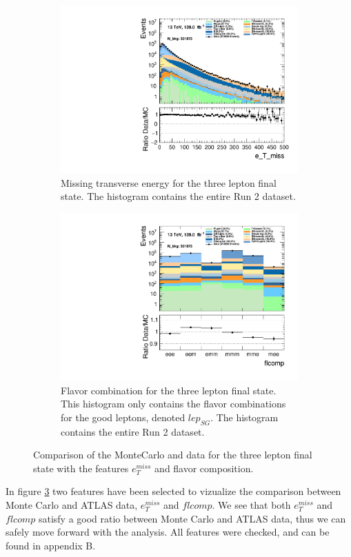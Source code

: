 \begin{figure}
    \centering
    \begin{subfigure}{.6\textwidth}
        \includegraphics[width=\textwidth]{Figures/MC_Data_comp/e_T_miss.pdf}
        \caption{Missing transverse energy for the three lepton final state. The histogram contains the entire Run 2 dataset.}
        \label{fig:etmiss}
    \end{subfigure}
    \hfill
    \begin{subfigure}{.6\textwidth}
        \includegraphics[width=\textwidth]{Figures/MC_Data_comp/flcomp.pdf}
        \caption{Flavor combination for the three lepton final state. This histogram only contains the flavor combinations for the good leptons, denoted $lep_{SG}$. The histogram contains the entire Run 2 dataset. }
        \label{fig:flcomp}
    \end{subfigure}
    \hfill        
    \caption{Comparison of the MonteCarlo and data for the three lepton final state with the features $e_{T}^{miss}$ and flavor composition.
    }
    \label{fig:MC_Data_comp}
\end{figure}

In figure \ref{fig:MC_Data_comp} two features have been selected to vizualize the comparison between Monte Carlo and ATLAS data, $e_T^{miss}$ and $flcomp$. 
We see that both $e_T^{miss}$ and $flcomp$ satisfy a good ratio between Monte Carlo and ATLAS data, thus we can safely move forward with the analysis. 
All features were checked, and can be found in appendix B.